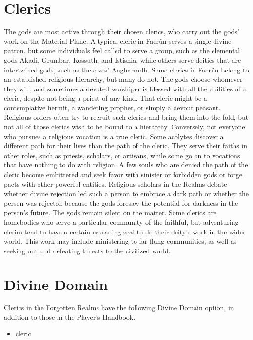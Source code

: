 \documentclass[10pt,a4paper,twoside,twocolumn,openany,bg=print,nodeprecatedcode]{dndbook}
\begin{document}
\section{Clerics}
The gods are most active through their chosen clerics, who carry out the gods' work on the Material Plane. A typical cleric in Faerûn serves a single divine patron, but some individuals feel called to serve a group, such as the elemental gods Akadi, Grumbar, Kossuth, and Istishia, while others serve deities that are intertwined gods, such as the elves' Angharradh.
Some clerics in Faerûn belong to an established religious hierarchy, but many do not. The gods choose whomever they will, and sometimes a devoted worshiper is blessed with all the abilities of a cleric, despite not being a priest of any kind. That cleric might be a contemplative hermit, a wandering prophet, or simply a devout peasant. Religious orders often try to recruit such clerics and bring them into the fold, but not all of those clerics wish to be bound to a hierarchy.
Conversely, not everyone who pursues a religious vocation is a true cleric. Some acolytes discover a different path for their lives than the path of the cleric. They serve their faiths in other roles, such as priests, scholars, or artisans, while some go on to vocations that have nothing to do with religion. A few souls who are denied the path of the cleric become embittered and seek favor with sinister or forbidden gods or forge pacts with other powerful entities. Religious scholars in the Realms debate whether divine rejection led such a person to embrace a dark path or whether the person was rejected because the gods foresaw the potential for darkness in the person's future. The gods remain silent on the matter.
Some clerics are homebodies who serve a particular community of the faithful, but adventuring clerics tend to have a certain crusading zeal to do their deity's work in the wider world. This work may include ministering to far-flung communities, as well as seeking out and defeating threats to the civilized world.
\section{Divine Domain}
Clerics in the Forgotten Realms have the following Divine Domain option, in addition to those in the Player's Handbook.

\begin{itemize}
\item cleric
\end{itemize}
\end{document}

